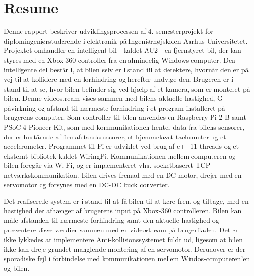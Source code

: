 \chapter{Resume}
\label{ch:Resume}

Denne rapport beskriver udviklingsprocessen af 4. semesterprojekt for diplomingeniørstuderende i elektronik på Ingeniørhøjskolen Aarhus Universitetet. 
Projektet omhandler en intelligent bil - kaldet AU2 - en fjernstyret bil, der kan styres med en Xbox-360 controller\cite{lib:xbox-360} fra en almindelig Windows-computer. 
Den intelligente del består i, at bilen selv er i stand til at detektere, hvornår den er på vej til at kollidere med en forhindring og herefter undvige den. 
Brugeren er i stand til at se, hvor bilen befinder sig ved hjælp af et kamera\cite{lib:cam}, som er monteret på bilen. 
Denne videostream vises sammen med bilens aktuelle hastighed, G-påvirkning og  afstand til nærmeste forhindring i et program installeret på brugerens computer.
Som controller til bilen anvendes en Raspberry Pi 2 B samt PSoC 4 Pioneer Kit\cite{lib:psoc4_guide}, som med \IIC kommunikationen henter data fra bilens sensorer, der er bestående af fire afstandssensorer\cite{lib:maxsonar}, et hjemmelavet tachometer og et accelerometer\cite{lib:accel}. 
Programmet til Pi er udviklet ved brug af c++11 threads og et eksternt \IIC bibliotek kaldet WiringPi\cite{lib:wiringpi}. 
Kommunikationen mellem computeren og bilen foregår via Wi-Fi, og er implementeret vha. socketbaseret TCP netværkskommunikation. 
Bilen drives fremad med en DC-motor, drejer med en servomotor og forsynes med en DC-DC buck converter.

Det realiserede system er i stand til at få bilen til at køre frem og tilbage, med en hastighed der afhænger af brugerens input på Xbox-360 controlleren. Bilen kan måle afstanden til nærmeste forhindring samt den aktuelle hastighed og præsentere disse værdier sammen med en videostream på brugerfladen. Det er ikke lykkedes at implementere Anti-kollisionssystemet fuldt ud, ligesom at bilen ikke kan dreje grundet manglende montering af en servomotor. Derudover er der sporadiske fejl i forbindelse med kommunikationen mellem Windos-computeren'en og bilen.
\clearpage